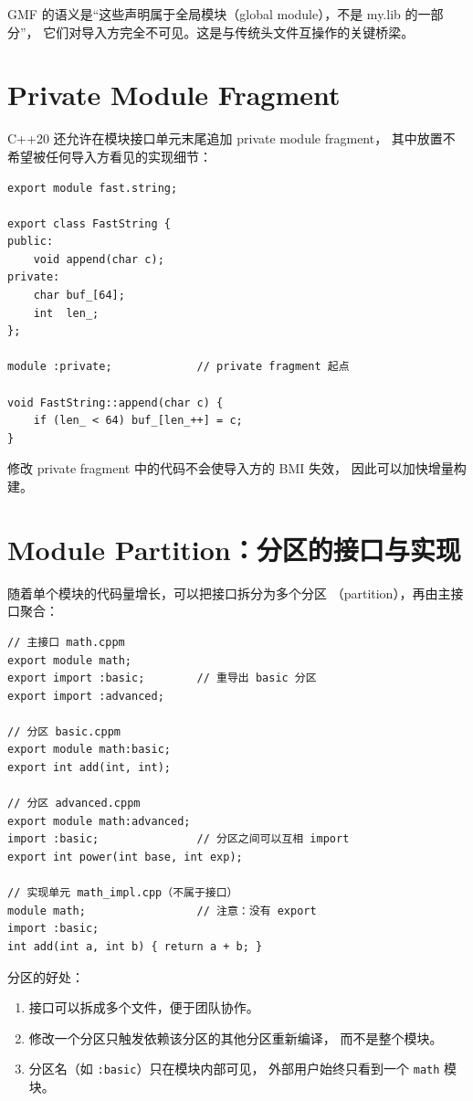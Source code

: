 \documentclass[12pt,a4paper,fontset=fandol]{ctexbook}
\newcommand{\cpplabel}{%
  \tcbox[on line,colback=cppheadbg,colframe=cppheadbg,
    boxrule=0pt,arc=1pt,left=2pt,right=2pt,top=1pt,bottom=1pt,
    colupper=white,fontupper=\scriptsize\bfseries]{C++}}
\newcommand{\flag}[1]{\texttt{#1}}
\begin{document}
GMF 的语义是“这些声明属于全局模块（global module），不是 my.lib 的一部分”，
它们对导入方完全不可见。这是与传统头文件互操作的关键桥梁。

\section{Private Module Fragment}

C++20 还允许在模块接口单元末尾追加 private module fragment，
其中放置不希望被任何导入方看见的实现细节：

\cpplabel
\begin{lstlisting}[style=cppstyle]
export module fast.string;

export class FastString {
public:
    void append(char c);
private:
    char buf_[64];
    int  len_;
};

module :private;             // private fragment 起点

void FastString::append(char c) {
    if (len_ < 64) buf_[len_++] = c;
}
\end{lstlisting}

修改 private fragment 中的代码不会使导入方的 BMI 失效，
因此可以加快增量构建。

\section{Module Partition：分区的接口与实现}

随着单个模块的代码量增长，可以把接口拆分为多个分区
（partition），再由主接口聚合：

\cpplabel
\begin{lstlisting}[style=cppstyle]
// 主接口 math.cppm
export module math;
export import :basic;        // 重导出 basic 分区
export import :advanced;

// 分区 basic.cppm
export module math:basic;
export int add(int, int);

// 分区 advanced.cppm
export module math:advanced;
import :basic;               // 分区之间可以互相 import
export int power(int base, int exp);

// 实现单元 math_impl.cpp（不属于接口）
module math;                 // 注意：没有 export
import :basic;
int add(int a, int b) { return a + b; }
\end{lstlisting}

分区的好处：

\begin{enumerate}
  \item 接口可以拆成多个文件，便于团队协作。
  \item 修改一个分区只触发依赖该分区的其他分区重新编译，
        而不是整个模块。
  \item 分区名（如 \flag{:basic}）只在模块内部可见，
        外部用户始终只看到一个 \flag{math} 模块。
\end{enumerate}
\end{document}
